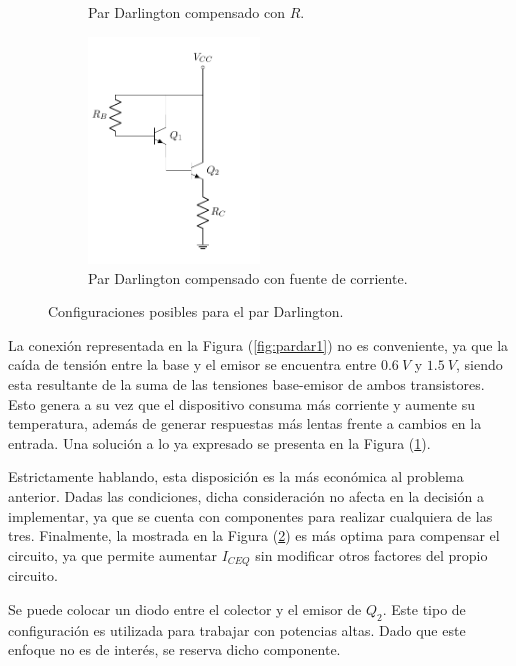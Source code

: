 \begin{figure}[H]
\begin{subfigure}{.4\textwidth}
	\caption{Par Darlington compensado con $R$.}
	\label{fig:pardar2}
\end{subfigure}
\begin{subfigure}{.5\textwidth}
\centering
	\includegraphics[width=0.5\textwidth, page=3]{Imagenes/ParDarlington.pdf}
	\caption{Par Darlington compensado con fuente de corriente.}
	\label{fig:pardar3}
\end{subfigure}
\caption{Configuraciones posibles para el par Darlington.}
\label{fig:pardar}
\end{figure}

La conexión representada en la Figura (\ref{fig:pardar1}) no es conveniente, ya que la caída de tensión entre la base y el emisor se encuentra entre $0.6 \ V$ y $1.5 \ V$, siendo esta resultante de la suma de las tensiones base-emisor de ambos transistores. Esto genera a su vez que el dispositivo consuma más corriente y aumente su temperatura, además de generar respuestas más lentas frente a cambios en la entrada. Una solución a lo ya expresado se presenta en la Figura (\ref{fig:pardar2}).

Estrictamente hablando, esta disposición es la más económica al problema anterior. Dadas las condiciones, dicha consideración no afecta en la decisión a implementar, ya que se cuenta con componentes para realizar cualquiera de las tres. Finalmente, la mostrada en la Figura (\ref{fig:pardar3}) es más optima para compensar el circuito, ya que permite aumentar $I_{CEQ}$ sin modificar otros factores del propio circuito.

Se puede colocar un diodo entre el colector y el emisor de $Q_2$. Este tipo de configuración es utilizada para trabajar con potencias altas. Dado que este enfoque no es de interés, se reserva dicho componente.

